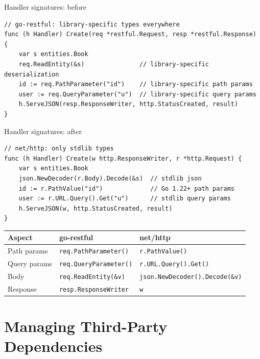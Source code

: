 \documentclass[aspectratio=169,11pt]{beamer}
\begin{document}
\begin{frame}[fragile]{Handler signatures: before}
\begin{lstlisting}
// go-restful: library-specific types everywhere
func (h Handler) Create(req *restful.Request, resp *restful.Response) {
	var s entities.Book
	req.ReadEntity(&s)               // library-specific deserialization
	id := req.PathParameter("id")    // library-specific path params
	user := req.QueryParameter("u")  // library-specific query params
	h.ServeJSON(resp.ResponseWriter, http.StatusCreated, result)
}
\end{lstlisting}
\end{frame}

\begin{frame}[fragile]{Handler signatures: after}
\begin{lstlisting}
// net/http: only stdlib types
func (h Handler) Create(w http.ResponseWriter, r *http.Request) {
	var s entities.Book
	json.NewDecoder(r.Body).Decode(&s)  // stdlib json
	id := r.PathValue("id")             // Go 1.22+ path params
	user := r.URL.Query().Get("u")      // stdlib query params
	h.ServeJSON(w, http.StatusCreated, result)
}
\end{lstlisting}

  \vspace{6pt}
  \begin{center}
  \small
  \begin{tabular}{lll}
    \textbf{Aspect} & \textbf{go-restful} & \textbf{net/http} \\
    \hline
    Path params & \texttt{req.PathParameter()} & \texttt{r.PathValue()} \\
    Query params & \texttt{req.QueryParameter()} & \texttt{r.URL.Query().Get()} \\
    Body & \texttt{req.ReadEntity(\&v)} & \texttt{json.NewDecoder().Decode(\&v)} \\
    Response & \texttt{resp.ResponseWriter} & \texttt{w} \\
  \end{tabular}
  \end{center}
\end{frame}

\section{Managing Third-Party Dependencies}
\end{document}
